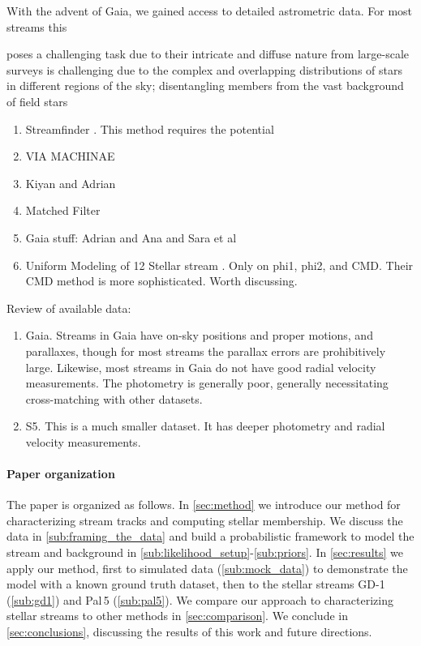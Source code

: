 \documentclass[twocolumn]{aastex631}
\newcommand{\stream}[1]{#1}
\begin{document}
        With the advent of Gaia, we gained access to detailed astrometric data. For most streams this 
        
        poses a challenging task due to their intricate and diffuse nature
        from large-scale surveys is challenging due to the complex and overlapping distributions of stars in different regions of the sky; disentangling members from the vast background of field stars 
    
        \begin{enumerate}
            \item Streamfinder \citep{2018MNRAS.477.4063M}. This method requires the potential
            \item VIA MACHINAE \citep{2022MNRAS.509.5992S}
            \item Kiyan and Adrian
            \item Matched Filter
            \item Gaia stuff: Adrian and Ana and Sara et al
            \item Uniform Modeling of 12 Stellar stream \citep{PatrickEtAl2022}. Only on phi1, phi2, and CMD. Their CMD method is more sophisticated. Worth discussing.
        \end{enumerate}

    Review of available data:
    \begin{enumerate}
        \item Gaia. Streams in Gaia have on-sky positions and proper motions, and parallaxes, though for most streams the parallax errors are prohibitively large. Likewise, most streams in Gaia do not have good radial velocity measurements. The photometry is generally poor, generally necessitating cross-matching with other datasets.
        \item S5. This is a much smaller dataset. It has deeper photometry and radial velocity measurements.
    \end{enumerate}

    \paragraph{Paper organization}

        The paper is organized as follows.
        In \autoref{sec:method} we introduce our method for characterizing stream tracks and computing stellar membership.
        We discuss the data in \autoref{sub:framing_the_data} and build a probabilistic framework to model the stream and background in \autoref{sub:likelihood_setup}-\autoref{sub:priors}.
        In \autoref{sec:results} we apply our method,
        first to simulated data (\autoref{sub:mock_data}) to demonstrate the model with a known ground truth dataset,
        then to the stellar streams \stream{GD-1} (\autoref{sub:gd1}) and \stream{Pal\,5} (\autoref{sub:pal5}).
        We compare our approach to characterizing stellar streams to other methods in \autoref{sec:comparison}.
        We conclude in \autoref{sec:conclusions}, discussing the results of this work and future directions.
\end{document}
